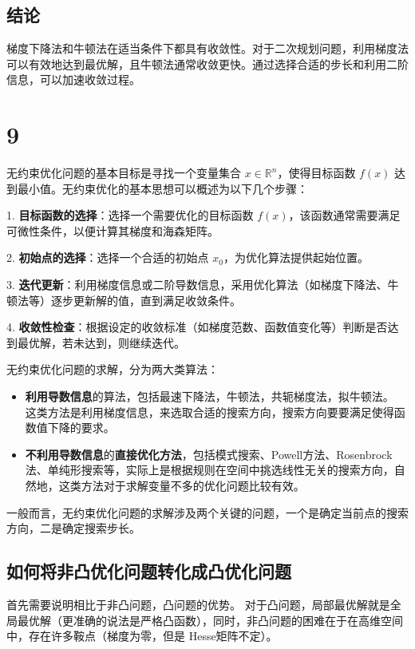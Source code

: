 \documentclass{article}
\begin{document}
    \subsection*{结论}

    梯度下降法和牛顿法在适当条件下都具有收敛性。对于二次规划问题，利用梯度法可以有效地达到最优解，且牛顿法通常收敛更快。通过选择合适的步长和利用二阶信息，可以加速收敛过程。

    \section*{9}

    无约束优化问题的基本目标是寻找一个变量集合 $x \in \mathbb{R}^n$，使得目标函数 $f(x)$ 达到最小值。无约束优化的基本思想可以概述为以下几个步骤：

    1. \textbf{目标函数的选择}：选择一个需要优化的目标函数 $f(x)$，该函数通常需要满足可微性条件，以便计算其梯度和海森矩阵。

    2. \textbf{初始点的选择}：选择一个合适的初始点 $x_0$，为优化算法提供起始位置。

    3. \textbf{迭代更新}：利用梯度信息或二阶导数信息，采用优化算法（如梯度下降法、牛顿法等）逐步更新解的值，直到满足收敛条件。

    4. \textbf{收敛性检查}：根据设定的收敛标准（如梯度范数、函数值变化等）判断是否达到最优解，若未达到，则继续迭代。

    无约束优化问题的求解，分为两大类算法：
    \begin{itemize}
        \item \textbf{利用导数信息}的算法，包括最速下降法，牛顿法，共轭梯度法，拟牛顿法。
    这类方法是利用梯度信息，来选取合适的搜索方向，搜索方向要要满足使得函数值下降的要求。
        \item  \textbf{不利用导数信息}的\textbf{直接优化方法}，包括模式搜索、Powell方法、Rosenbrock法、单纯形搜索等，实际上是根据规则在空间中挑选线性无关的搜索方向，自然地，这类方法对于求解变量不多的优化问题比较有效。
    \end{itemize}
    
    一般而言，无约束优化问题的求解涉及两个关键的问题，一个是确定当前点的搜索方向，二是确定搜索步长。

    \subsection*{如何将非凸优化问题转化成凸优化问题}

    首先需要说明相比于非凸问题，凸问题的优势。
    对于凸问题，局部最优解就是全局最优解（更准确的说法是严格凸函数），同时，非凸问题的困难在于在高维空间中，存在许多鞍点（梯度为零，但是
    Hesse矩阵不定）。
\end{document}
